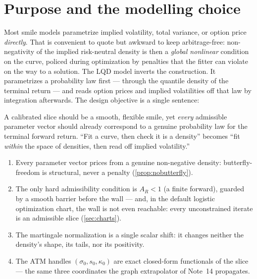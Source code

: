 \documentclass[11pt]{article}
\begin{document}
\tableofcontents
\newpage

\section{Purpose and the modelling choice}
\label{sec:purpose}

Most smile models parametrize implied volatility, total variance, or option
price \emph{directly}. That is convenient to quote but awkward to keep
arbitrage-free: non-negativity of the implied risk-neutral density is then a
\emph{global nonlinear} condition on the curve, policed during optimization by
penalties that the fitter can violate on the way to a solution. The LQD model
inverts the construction. It parametrizes a probability law first --- through
the quantile density of the terminal return --- and reads option prices and
implied volatilities off that law by integration afterwards. The design
objective is a single sentence:

\begin{heuristic}
A calibrated slice should be a smooth, flexible smile, yet \emph{every}
admissible parameter vector should already correspond to a genuine probability
law for the terminal forward return. ``Fit a curve, then check it is a
density'' becomes ``fit \emph{within} the space of densities, then read off
implied volatility.''
\end{heuristic}

\begin{invariant}
\begin{enumerate}[leftmargin=1.6em]
\item Every parameter vector prices from a genuine non-negative density:
butterfly-freedom is structural, never a penalty
(\cref{prop:nobutterfly}).
\item The only hard admissibility condition is $A_R<1$ (a finite forward),
guarded by a smooth barrier before the wall --- and, in the default logistic
optimization chart, the wall is not even reachable: every unconstrained
iterate is an admissible slice (\cref{sec:charts}).
\item The martingale normalization is a single scalar shift: it changes
neither the density's shape, its tails, nor its positivity.
\item The ATM handles $(\sigma_0,s_0,\kappa_0)$ are exact closed-form
functionals of the slice --- the same three coordinates the graph
extrapolator of Note~14 propagates.
\end{enumerate}
\end{invariant}
\end{document}
